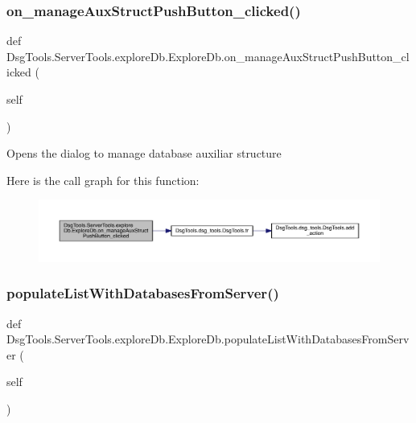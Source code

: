 \subsubsection{\texorpdfstring{on\+\_\+manage\+Aux\+Struct\+Push\+Button\+\_\+clicked()}{on\_manageAuxStructPushButton\_clicked()}}
{\footnotesize\ttfamily def Dsg\+Tools.\+Server\+Tools.\+explore\+Db.\+Explore\+Db.\+on\+\_\+manage\+Aux\+Struct\+Push\+Button\+\_\+clicked (\begin{DoxyParamCaption}\item[{}]{self }\end{DoxyParamCaption})}

\begin{DoxyVerb}Opens the dialog to manage database auxiliar structure
\end{DoxyVerb}
 Here is the call graph for this function\+:
\nopagebreak
\begin{figure}[H]
\begin{center}
\leavevmode
\includegraphics[width=350pt]{class_dsg_tools_1_1_server_tools_1_1explore_db_1_1_explore_db_a738d6d63f19fa42032b3db3af95faf51_cgraph}
\end{center}
\end{figure}
\mbox{\label{class_dsg_tools_1_1_server_tools_1_1explore_db_1_1_explore_db_a92e2b2f1b14fdcd6e227da04ad5e4309}} 
\subsubsection{\texorpdfstring{populate\+List\+With\+Databases\+From\+Server()}{populateListWithDatabasesFromServer()}}
{\footnotesize\ttfamily def Dsg\+Tools.\+Server\+Tools.\+explore\+Db.\+Explore\+Db.\+populate\+List\+With\+Databases\+From\+Server (\begin{DoxyParamCaption}\item[{}]{self }\end{DoxyParamCaption})}

